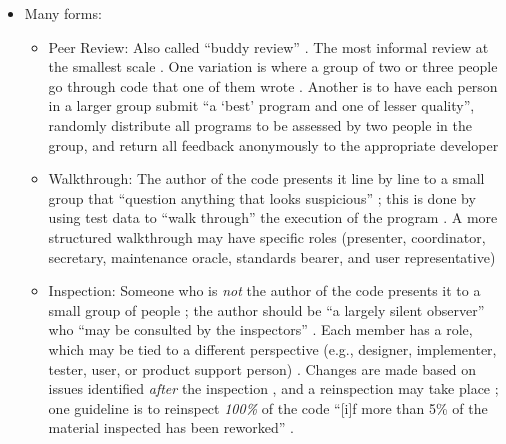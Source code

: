 \begin{itemize}
      \item Many forms:
            \begin{itemize}
                  \item Peer Review: Also called ``buddy review''
                        \citep[p.~94]{Patton2006}. The most informal
                        review at the smallest scale \citep[p.~94]{Patton2006}.
                        One variation is where a group of two or three people
                        go through code that one of them wrote
                        \citep[p.~94]{Patton2006}. Another is to
                        have each person in a larger group submit ``a `best'
                        program and one of lesser quality'', randomly distribute
                        all programs to be assessed by two people in the group,
                        and return all feedback anonymously to the appropriate
                        developer \citep[p.~414]{vanVliet2000}
                  \item Walkthrough: The author of the code presents it line
                        by line to a small group that ``question anything that
                        looks suspicious'' \citep[p.~95]{Patton2006};
                        this is done by using test data to ``walk through''
                        the execution of the program
                        \citep[p.~416]{vanVliet2000}. A more
                        structured walkthrough may have specific roles
                        (presenter, coordinator, secretary, maintenance oracle,
                        standards bearer, and user representative)
                        \citep[p.~484]{PetersAndPedrycz2000}
                  \item Inspection: Someone who is \emph{not} the author of the
                        code presents it to a small group of people
                        \citep[p.~95]{Patton2006}; the author
                        should be ``a largely silent observer'' who
                        ``may be consulted by the inspectors''
                        \citep[p.~415]{vanVliet2000}. Each member has
                        a role, which may be tied to a different perspective
                        (e.g., designer, implementer, tester,
                        \citep[p.~439]{PetersAndPedrycz2000} user, or product
                        support person) \citep[p.~95]{Patton2006}.
                        Changes are made based on issues identified \emph{after}
                        the inspection \citep[p.~415]{vanVliet2000},
                        and a reinspection may take place
                        \citep[p.~95]{Patton2006}; one guideline is to
                        reinspect \emph{100\%} of the code ``[i]f more than 5\%
                        of the material inspected has been reworked''
                        \citep[p.~483]{PetersAndPedrycz2000}.
            \end{itemize}


\end{itemize}
